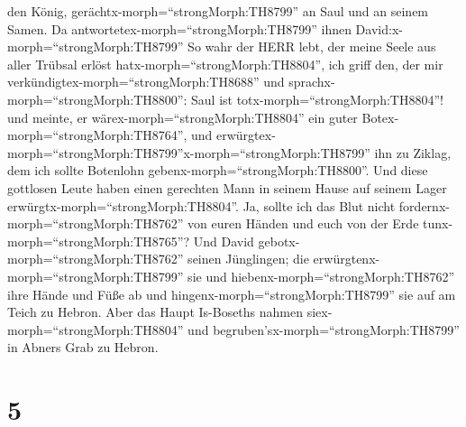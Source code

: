 den König, gerächtx-morph=``strongMorph:TH8799'' an Saul und an seinem
Samen.  Da antwortetex-morph=``strongMorph:TH8799'' ihnen
David:x-morph=``strongMorph:TH8799'' So wahr der HERR lebt, der meine
Seele aus aller Trübsal erlöst hatx-morph=``strongMorph:TH8804'',
 ich griff den, der mir
verkündigtex-morph=``strongMorph:TH8688'' und
sprachx-morph=``strongMorph:TH8800'': Saul ist
totx-morph=``strongMorph:TH8804''! und meinte, er
wärex-morph=``strongMorph:TH8804'' ein guter
Botex-morph=``strongMorph:TH8764'', und
erwürgtex-morph=``strongMorph:TH8799''x-morph=``strongMorph:TH8799'' ihn
zu Ziklag, dem ich sollte Botenlohn gebenx-morph=``strongMorph:TH8800''.
 Und diese gottlosen Leute haben einen gerechten Mann in
seinem Hause auf seinem Lager erwürgtx-morph=``strongMorph:TH8804''. Ja,
sollte ich das Blut nicht fordernx-morph=``strongMorph:TH8762'' von
euren Händen und euch von der Erde tunx-morph=``strongMorph:TH8765''?
 Und David gebotx-morph=``strongMorph:TH8762'' seinen
Jünglingen; die erwürgtenx-morph=``strongMorph:TH8799'' sie und
hiebenx-morph=``strongMorph:TH8762'' ihre Hände und Füße ab und
hingenx-morph=``strongMorph:TH8799'' sie auf am Teich zu Hebron. Aber
das Haupt Is-Boseths nahmen siex-morph=``strongMorph:TH8804'' und
begruben'sx-morph=``strongMorph:TH8799'' in Abners Grab zu Hebron.

\hypertarget{section-4}{%
\section{5}\label{section-4}}

